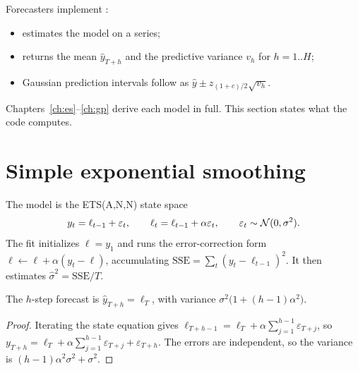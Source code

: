 Forecasters implement :
\begin{itemize}
  \item {} estimates the model on a series;
  \item {} returns the mean $\hat y_{T+h}$ and the predictive variance $v_h$
        for $h=1..H$;
  \item Gaussian prediction intervals follow as $\hat y\pm z_{(1+c)/2}\sqrt{v_h}$.
\end{itemize}
Chapters~\ref{ch:es}--\ref{ch:gp} derive each model in full. This section states
what the code computes.

\section{Simple exponential smoothing}
The model is the ETS(A,N,N) state space
\[
  y_t=\ell_{t-1}+\varepsilon_t,\qquad \ell_t=\ell_{t-1}+\alpha\varepsilon_t,\qquad
  \varepsilon_t\sim\mathcal{N}(0,\sigma^2).
\]
The fit initializes $\ell=y_1$ and runs the error-correction form
$\ell\leftarrow\ell+\alpha(y_t-\ell)$, accumulating $\mathrm{SSE}=\sum_t(y_t-\ell_{t-1})^2$.
It then estimates $\hat\sigma^2=\mathrm{SSE}/T$.

\begin{proposition}
The $h$-step forecast is $\hat y_{T+h}=\ell_T$, with variance $\sigma^2\big(1+(h-1)\alpha^2\big)$.
\end{proposition}
\begin{proof}
Iterating the state equation gives $\ell_{T+h-1}=\ell_T+\alpha\sum_{j=1}^{h-1}\varepsilon_{T+j}$,
so $y_{T+h}=\ell_T+\alpha\sum_{j=1}^{h-1}\varepsilon_{T+j}+\varepsilon_{T+h}$. The errors are
independent, so the variance is $(h-1)\alpha^2\sigma^2+\sigma^2$.
\end{proof}

